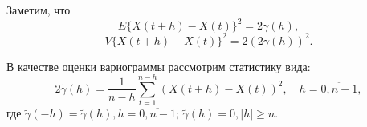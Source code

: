 Заметим, что
\begin{equation}
\label{eq:E_diff_inc}
	E \{ X(t + h) - X(t) \}^2 = 2 \gamma(h),
\end{equation}
\begin{equation}
\label{eq:V_diff_inc}
	V \{ X(t + h) - X(t) \}^2 = 2 (2 \gamma(h))^2.
\end{equation}

В качестве оценки вариограммы рассмотрим статистику вида:
\begin{equation}
	\label{eq:var_est}
	2 \tilde{\gamma}(h) = \frac{1}{n - h} \sum_{t = 1}^{n - h}(X(t + h) - X(t))^2, \quad h = \overline{0, n - 1},
\end{equation}
где $ \tilde{\gamma}(-h) = \tilde{\gamma}(h), h = \overline{0, n - 1}$; $ \tilde{\gamma}(h) = 0, |h| \ge n $.
